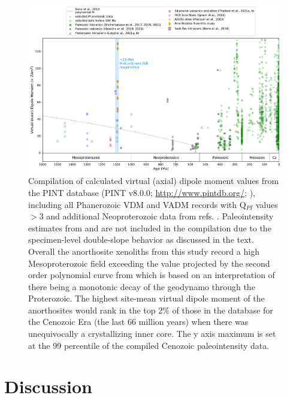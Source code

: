 \documentclass[9pt,twocolumn,twoside,lineno]{pnas-new}
\begin{document}
\begin{figure}[h!]
\noindent\includegraphics[width=17.8 cm]{PINT_compilation.pdf}
\centering
\caption{\footnotesize{Compilation of calculated virtual (axial) dipole moment values from the PINT database (PINT v8.0.0; \url{http://www.pintdb.org/}; \citealp{Bono2021a}), including all Phanerozoic VDM and VADM records with Q$_{PI}$ values $>$3 and additional Neoproterozoic data from refs. \citealp{Lloyd2021a, Lloyd2021b, Thallner2021a, Thallner2021b}. Paleointensity estimates from \cite{Pesonen1983a} and \cite{Kulakov2013a} are not included in the compilation due to the specimen-level double-slope behavior as discussed in the text. Overall the anorthosite xenoliths from this study record a high Mesoproterozoic field exceeding the value projected by the second order polynomial curve from \cite{Bono2019a} which is based on an interpretation of there being a monotonic decay of the geodynamo through the Proterozoic. The highest site-mean virtual dipole moment of the anorthosites would rank in the top 2$\%$ of those in the database for the Cenozoic Era (the last 66 million years) when there was unequivocally a crystallizing inner core. The y axis maximum is set at the 99 percentile of the compiled Cenozoic paleointensity data.}}
\label{fig:PINT_compilation}
\end{figure}

\section*{Discussion}
\end{document}
